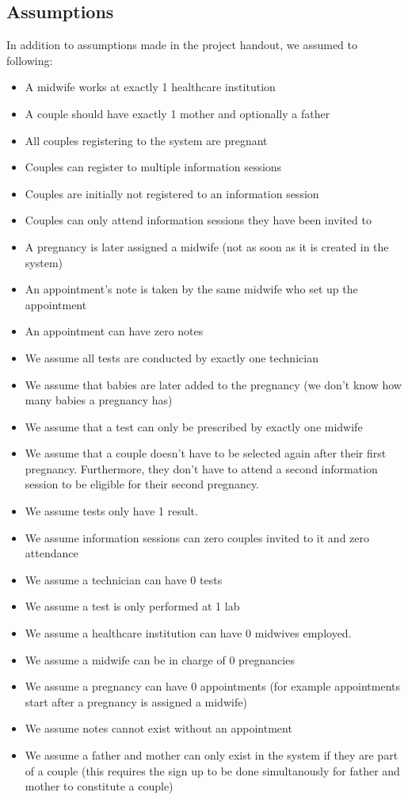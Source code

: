 \documentclass[10pt, letterpaper]{article}
\begin{document}
\subsection*{Assumptions}
In addition to assumptions made in the project handout, we assumed to following:
\begin{itemize}
    \item A midwife works at exactly 1 healthcare institution
    \item A couple should have exactly 1 mother and optionally a father
    \item All couples registering to the system are pregnant
    \item Couples can register to multiple information sessions
    \item Couples are initially not registered to an information session
    \item Couples can only attend information sessions they have been invited to
    \item A pregnancy is later assigned a midwife (not as soon as it is created in the system)
    \item An appointment's note is taken by the same midwife who set up the appointment
    \item An appointment can have zero notes
    \item We assume all tests are conducted by exactly one technician
    \item We assume that babies are later added to the pregnancy (we don't know how many babies a pregnancy has)
    \item We assume that a test can only be prescribed by exactly one midwife
    \item We assume that a couple doesn't have to be selected again after their first pregnancy. Furthermore, they don't have to attend a second information session to be eligible for their second pregnancy.
    \item We assume tests only have 1 result.
    \item We assume  information sessions can zero couples invited to it and zero attendance
    \item We assume a technician can have 0 tests
    \item We assume a test is only performed at 1 lab
    \item We assume a healthcare institution can have 0 midwives employed.
    \item We assume a midwife can be in charge of 0 pregnancies
    \item We assume a pregnancy can have 0 appointments (for example appointments start after a pregnancy is assigned a midwife)
    \item We assume notes cannot exist without an appointment
    \item We assume a father and mother can only exist in the system if they are part of a couple (this requires the sign up to be done simultanously for father and mother to constitute a couple)
\end{itemize}
\end{document}
